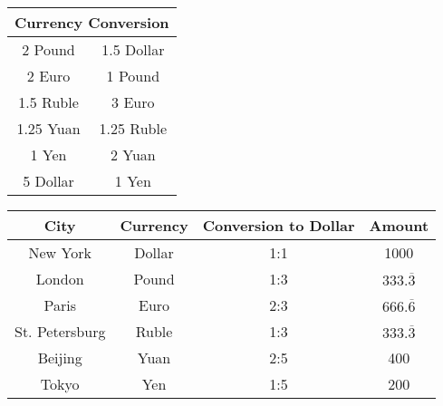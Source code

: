 \documentclass[12pt]{article}
\begin{document}
\begin{enumerate}
	\begin{tabular}{ | c | c | }
	\hline
	\multicolumn{2}{|c|}{\bf{Currency Conversion}} \\ \hline \hline
	2 Pound & 1.5 Dollar \\ \hline
	2 Euro & 1 Pound \\ \hline
	1.5 Ruble & 3 Euro \\ \hline
	1.25 Yuan & 1.25 Ruble \\ \hline
	1 Yen & 2 Yuan \\ \hline
	5 Dollar & 1 Yen \\ \hline
	\hline
	\end{tabular}

	\begin{tabular}{ | c | c | c | c | }
	\hline
	\bf{City} & \bf{Currency} & \bf{Conversion to Dollar} & \bf{Amount} \\ \hline \hline
	New York & Dollar & 1:1 & 1000 \\ \hline
	London & Pound & 1:3 & \( 333.\overline{3} \) \\ \hline
	Paris & Euro & 2:3 & \( 666.\overline{6} \) \\ \hline
	St. Petersburg & Ruble & 1:3 & \( 333.\overline{3} \) \\ \hline
	Beijing & Yuan & 2:5 & 400 \\ \hline
	Tokyo & Yen & 1:5 & 200 \\ \hline
	\hline
	\end{tabular}
\end{enumerate}
\end{document}
